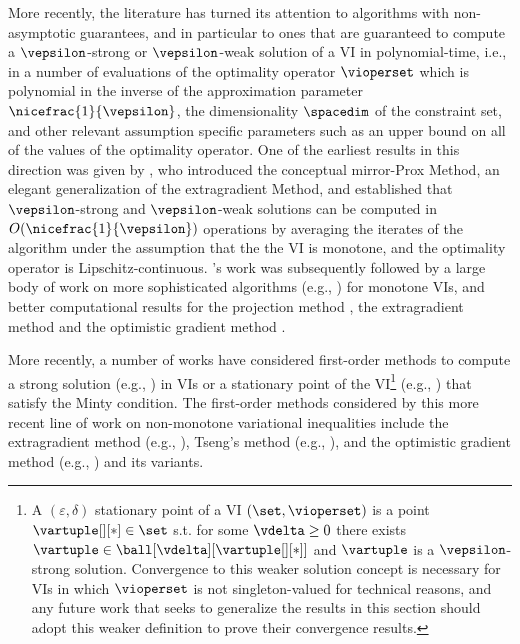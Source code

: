 More recently, the literature has turned its attention to algorithms with non-asymptotic guarantees, and in particular to ones that are guaranteed to compute a $\vepsilon$-strong or $\vepsilon$-weak solution of a VI in polynomial-time, i.e., in a number of evaluations of the optimality operator $\vioperset$ which is polynomial in the inverse of the approximation parameter $\nicefrac{1}{\vepsilon}$, the dimensionality $\spacedim$ of the constraint set, and other relevant assumption specific parameters such as an upper bound on all of the values of the optimality operator. One of the earliest results in this direction was given by \citet{nemirovski2004prox}, who introduced the conceptual mirror-Prox Method, an elegant generalization of the extragradient Method, and established that $\vepsilon$-strong and $\vepsilon$-weak solutions can be computed in $O(\nicefrac{1}{\vepsilon})$ operations by averaging the iterates of the algorithm under the assumption that the the VI is monotone, and the optimality operator is Lipschitz-continuous. \citeauthor{nemirovski2004prox}'s work was subsequently followed by a large body of work on more sophisticated algorithms (e.g., 
\cite{auslender2005interior, diakonikolas2020halpern}) for monotone VIs, and better computational results for the projection method \cite{gidel2018variational}, the extragradient method  \cite{gorbunov2022extragradient, golowich2020tight, cai2022tight} and the optimistic gradient method \cite{gorbunov2022last}.

More recently, a number of works have considered first-order methods to compute a strong solution (e.g., \citet{loizou2021quasiSGDA, he2022convergence, diakonikolas2020halpern}) in VIs or a stationary point of the VI\footnote{A $(\varepsilon, \delta)$ stationary point of a VI $(\set, \vioperset)$ is a point $\vartuple[][*] \in \set$ s.t. for some $\vdelta \geq 0$ there exists $\vartuple \in \ball[\vdelta][{\vartuple[][*]}]$ and $\vartuple$ is a $\vepsilon$-strong solution. Convergence to this weaker solution concept is necessary for VIs in which $\vioperset$ is not singleton-valued for technical reasons, and any future work that seeks to generalize the results in this section should adopt this weaker definition to prove their convergence results.} (e.g., \citet{liu2021first}) that satisfy the Minty condition. The first-order methods considered by this more recent line of work on non-monotone variational inequalities include the extragradient method (e.g., \cite{wang2024extragradient, ofem2023modified}), Tseng's method (e.g., \cite{censor2011strong,thong2020self,uzor2023solving, dung2024convergence,aremu2024modified}), and the optimistic gradient method (e.g., \cite{Lin2022Perseus}) and its variants.



